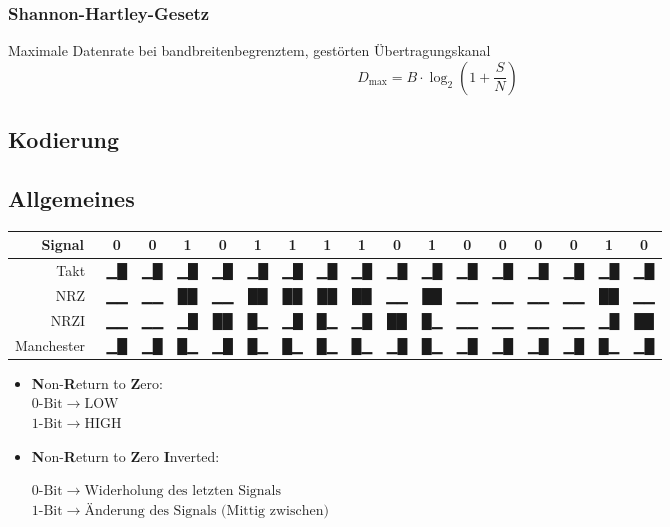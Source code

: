 \documentclass
[
	8pt,		%
	ngerman,	%
	a4paper,	%
	landscape,	%
	final		%
]{extarticle}
\begin{document}
\begin{multicols*}{4}
\subsubsection{Shannon-Hartley-Gesetz}
Maximale Datenrate bei bandbreitenbegrenztem, gestörten Übertragungskanal
\[D_{\text{max}} = B \cdot \log_2\left(1+\frac{S}{N}\right)\]
\subsection{Kodierung}
\subsection{Allgemeines}
\begingroup\setlength\tabcolsep{0pt}
\begin{center}
	\begin{tabular}{r!{\color{gray}\vline}c!{\color{gray}\vline}c!{\color{gray}\vline}c!{\color{gray}\vline}c!{\color{gray}\vline}c!{\color{gray}\vline}c!{\color{gray}\vline}c!{\color{gray}\vline}c!{\color{gray}\vline}c!{\color{gray}\vline}c!{\color{gray}\vline}c!{\color{gray}\vline}c!{\color{gray}\vline}c!{\color{gray}\vline}c!{\color{gray}\vline}c!{\color{gray}\vline}c!{\color{gray}\vline}}
		Signal~     & 0  & 0  & 1  & 0  & 1  & 1  & 1  & 1  & 0  & 1  & 0  & 0  & 0  & 0  & 1  & 0\tabularnewline
		\hline
		Takt~       & ▁█ & ▁█ & ▁█ & ▁█ & ▁█ & ▁█ & ▁█ & ▁█ & ▁█ & ▁█ & ▁█ & ▁█ & ▁█ & ▁█ & ▁█ & ▁█\tabularnewline
		NRZ~        & ▁▁ & ▁▁ & ██ & ▁▁ & ██ & ██ & ██ & ██ & ▁▁ & ██ & ▁▁ & ▁▁ & ▁▁ & ▁▁ & ██ & ▁▁\tabularnewline
		NRZI~       & ▁▁ & ▁▁ & ▁█ & ██ & █▁ & ▁█ & █▁ & ▁█ & ██ & █▁ & ▁▁ & ▁▁ & ▁▁ & ▁▁ & ▁█ & ██\tabularnewline
		Manchester~ & ▁█ & ▁█ & █▁ & ▁█ & █▁ & █▁ & █▁ & █▁ & ▁█ & █▁ & ▁█ & ▁█ & ▁█ & ▁█ & █▁ & ▁█\tabularnewline
	\end{tabular}
\end{center}
\endgroup
\begin{itemize}
	\item \textbf{N}on-\textbf{R}eturn to \textbf{Z}ero:\\
	      \(0\text{-Bit} \rightarrow \text{LOW}\)\\
	      \(1\text{-Bit} \rightarrow \text{HIGH}\)
	\item \textbf{N}on-\textbf{R}eturn to \textbf{Z}ero \textbf{I}nverted:\par
	      \(0\text{-Bit} \rightarrow \text{Widerholung des letzten Signals}\) \\
	      \(1\text{-Bit} \rightarrow \text{Änderung des Signals (Mittig zwischen)}\) \\
\end{itemize}

\end{multicols*}
\end{document}
